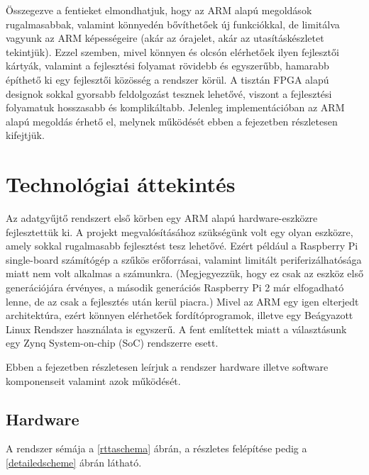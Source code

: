 \documentclass[a4paper,12pt]{report}
\begin{document}
Összegezve a fentieket elmondhatjuk, hogy az ARM alapú megoldások rugalmasabbak, valamint könnyedén bővíthetőek új funkciókkal, de limitálva vagyunk az ARM képességeire (akár az órajelet, akár az utasításkészletet tekintjük).  Ezzel szemben, mivel könnyen és olcsón elérhetőek ilyen fejlesztői kártyák, valamint a fejlesztési folyamat rövidebb és egyszerűbb, hamarabb építhető ki egy fejlesztői közösség a rendszer körül. A tisztán FPGA alapú designok sokkal gyorsabb feldolgozást tesznek lehetővé, viszont a fejlesztési folyamatuk hosszasabb és komplikáltabb. Jelenleg implementációban az ARM alapú megoldás érhető el, melynek működését ebben a fejezetben részletesen kifejtjük.

\section{Technológiai áttekintés}

Az adatgyűjtő rendszert első körben egy ARM alapú hardware-eszközre fejlesztettük ki. A projekt megvalósításához szükségünk volt egy olyan eszközre, amely sokkal rugalmasabb fejlesztést tesz lehetővé. Ezért például a Raspberry Pi single-board számítógép a szűkös erőforrásai, valamint limitált periferizálhatósága miatt nem volt alkalmas a számunkra. (Megjegyezzük, hogy ez csak az eszköz első generációjára érvényes, a második generációs Raspberry Pi 2 már elfogadható lenne, de az csak a fejlesztés után kerül piacra.) Mivel az ARM egy igen elterjedt architektúra, ezért könnyen elérhetőek fordítóprogramok, illetve egy Beágyazott Linux Rendszer használata is egyszerű. A fent említettek miatt a választásunk egy Zynq System-on-chip (SoC) rendszerre esett.

Ebben a fejezetben részletesen leírjuk a rendszer hardware illetve software komponenseit valamint azok működését.

\subsection{Hardware}
\label{rttahw}

A rendszer sémája a \ref{rttaschema} ábrán, a részletes felépítése pedig a \ref{detailedscheme} ábrán látható.
\end{document}
